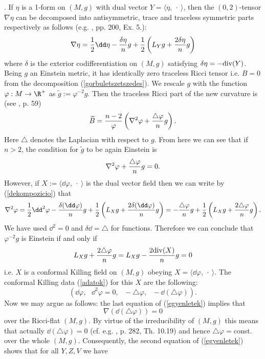 \documentclass[a4paper,12pt,draft]{article}
\begin{document}
. If $\eta$ is a 1-form on $(M,g)$ with
dual vector $Y=\langle\eta ,\:\cdot\:\rangle$, then the $(0,2)$-tensor
$\nabla\eta$ can be decomposed into antisymmetric, trace and traceless
symmetric parts respectively as follows (e.g. \cite{pet}, pp. 200,
Ex. 5.):
\begin{equation}
\nabla\eta={1\over 2}\dd\eta -{\delta\eta\over n}g+{1\over 2}\left(
L_Yg+{2\delta\eta\over n}g\right)
\label{dekompozicio}
\end{equation}
where $\delta$ is the exterior codifferentiation on $(M,g)$
satisfying $\delta\eta =-{\rm div}(Y)$. Being $g$ an Einstein metric, it
has identically zero traceless Ricci tensor i.e. $B=0$ from the
decomposition (\ref{gorbuletszetszedes}). We rescale
$g$ with the function $\varphi :M\rightarrow\R^+$ as
$\tilde{g}:=\varphi^{-2}g$. Then the traceless Ricci part of the new
curvature is (see \cite{bes}, p. 59)
\[\widetilde{B}= {n-2\over\varphi}\left(\nabla^2\varphi
+{\triangle\varphi\over n}g\right) .\]  
Here $\triangle$ denotes the Laplacian with respect to $g$. From here we
can see that if $n>2$, the condition for $\tilde{g}$ to be again Einstein
is
\[\nabla^2\varphi +{\triangle\varphi\over n}g =0.\]
However, if $X:=\langle\dd\varphi ,\:\cdot\:\rangle$ is the dual vector
field then we can write by (\ref{dekompozicio}) that
\[\nabla^2\varphi ={1\over 2}\dd^2\varphi -{\delta (\dd\varphi
)\over n}g+{1\over 2}\left( L_Xg+{2\delta (\dd\varphi )\over n}g\right) =
-{\triangle\varphi\over n}g+{1\over 2}\left( L_Xg+{2\triangle\varphi\over 
n}g\right).\]
We have used $\dd^2=0$ and $\delta\dd =\triangle$ for functions. Therefore
we can conclude that $\varphi^{-2}g$ is Einstein if and only if
\[L_Xg+{2\triangle\varphi\over n}g=L_Xg-{2{\rm div}(X)\over n}g=0\]
i.e. $X$ is a conformal Killing field on $(M,g)$ obeying 
$X=\langle\dd\varphi ,\:\cdot\:\rangle$. The conformal Killing data
(\ref{adatok}) for this $X$ are the following:
\begin{equation}
(\dd\varphi ,\:\:\:\dd^2\varphi =0,\:\:\: -\triangle\varphi ,\:\:\:-\dd
(\triangle\varphi )).
\label{konkretadatok}
\end{equation}
Now we may argue as follows: the last equation of
(\ref{egyenletek}) implies that 
\[\nabla ( \dd (\triangle\varphi ))=0\]
over the Ricci-flat $(M, g)$. By virtue of the irreducibility of
$(M,g)$ this means that actually $\dd (\triangle\varphi )=0$ (cf.
e.g. \cite{bes}, p. 282, Th. 10.19) and hence $\triangle\varphi
=$const. over the whole $(M,g)$. Consequently, the second equation of
(\ref{egyenletek}) shows that for all $Y,Z,V$ we have
\end{document}
